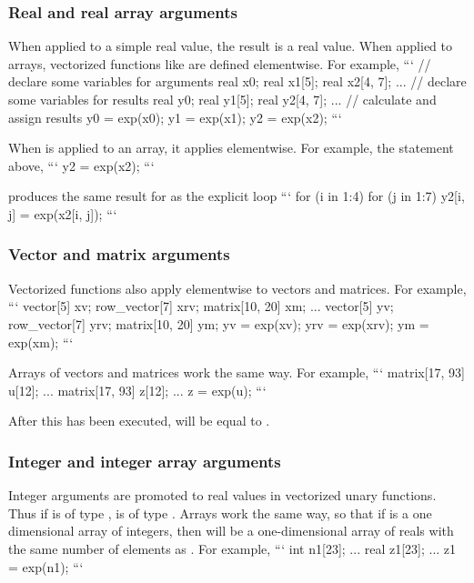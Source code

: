 \begin{description}
\begin{description}
\begin{description}
\begin{description}
\subsubsection{Real and real array arguments}

When applied to a simple real value, the result is a real value.  When applied to arrays, vectorized functions like  are defined elementwise.  For example,
```
// declare some variables for arguments
real x0;
real x1[5];
real x2[4, 7];
 ...
// declare some variables for results
real y0;
real y1[5];
real y2[4, 7];
 ... 
// calculate and assign results
y0 = exp(x0);
y1 = exp(x1);
y2 = exp(x2); 
```

When  is applied to an array, it applies elementwise.  For example, the statement above,
```
y2 = exp(x2); 
```

produces the same result for  as the explicit loop
```
for (i in 1:4)
   for (j in 1:7)
     y2[i, j] = exp(x2[i, j]); 
```


\subsubsection{Vector and matrix arguments}

Vectorized functions also apply elementwise to vectors and matrices. For example,
```
vector[5] xv;
row_vector[7] xrv;
matrix[10, 20] xm;
 ...
vector[5] yv;
row_vector[7] yrv;
matrix[10, 20] ym;
yv = exp(xv);
yrv = exp(xrv);
ym = exp(xm); 
```


Arrays of vectors and matrices work the same way.  For example,
```
matrix[17, 93] u[12];
 ...
matrix[17, 93] z[12];
 ... 
z = exp(u); 
```

After this has been executed,  will be equal to .

\subsubsection{Integer and integer array arguments}

Integer arguments are promoted to real values in vectorized unary functions.  Thus if  is of type ,  is of type .  Arrays work the same way, so that if  is a one dimensional array of integers, then  will be a one-dimensional array of reals with the same number of elements as .  For example,
```
int n1[23];
 ... 
real z1[23];
 ... 
z1 = exp(n1); 
```


\end{description}
\end{description}
\end{description}
\end{description}
